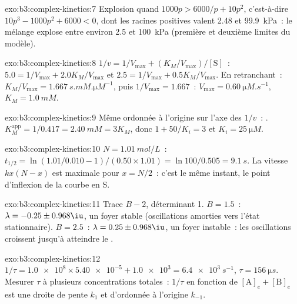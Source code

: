 \begin{solution}{exo:b3:complex-kinetics:7}
Explosion quand $1000p > 6000/p + 10p^2$, c'est-à-dire $10p^3 - 1000p^2 + 6000 < 0$,
dont les racines positives
valent 2.48 et \qty{99.9}{kPa}~: le mélange explose entre environ 2.5 et
\qty{100}{kPa} (première et deuxième limites du modèle).
\end{solution}

\begin{solution}{exo:b3:complex-kinetics:8}
$1/v = 1/V_{\max} + (K_M/V_{\max})/[\mathrm S]$~: $5.0 = 1/V_{\max} + 2.0K_M/V_{\max}$ et $2.5 = 1/V_{\max} + 0.5K_M/V_{\max}$.
En retranchant~: $K_M/V_{\max} = \qty{1.667}{s.mM.\micro M^{-1}}$, puis $1/V_{\max} = 1.667$~: $V_{\max} = \qty{0.60}{\micro M.s^{-1}}$,
$K_M = \qty{1.0}{mM}$.
\end{solution}

\begin{solution}{exo:b3:complex-kinetics:9}
Même ordonnée à l'origine sur l'axe des $1/v$~: .
$K_M^{\mathrm{app}} = 1/0.417 = \qty{2.40}{mM} = 3K_M$, donc
$1 + 50/K_i = 3$ et $K_i = \qty{25}{\micro M}$.
\end{solution}

\begin{solution}{exo:b3:complex-kinetics:10}
$N = \qty{1.01}{mol/L}$~: $t_{1/2} = \ln(1.01/0.010 - 1)/(0.50 \times 1.01) = \ln100/0.505 = \qty{9.1}{s}$.
La vitesse $kx(N - x)$ est maximale pour $x = N/2$~: c'est le même
instant, le point d'inflexion de la courbe en S.
\end{solution}

\begin{solution}{exo:b3:complex-kinetics:11}
Trace $B - 2$, déterminant 1. $B = 1.5$~: $\lambda = -0.25 \pm 0.968\iu$,
un foyer stable (oscillations amorties vers l'état stationnaire).
$B = 2.5$~: $\lambda = 0.25 \pm 0.968\iu$, un foyer instable~: les
oscillations croissent jusqu'à atteindre le .
\end{solution}

\begin{solution}{exo:b3:complex-kinetics:12}
$1/\tau = \num{1.0e8} \times \num{5.40e-5} + \num{1.0e3} = \qty{6.4e3}{s^{-1}}$, $\tau = \qty{156}{\micro s}$.
Mesurer $\tau$ à plusieurs
concentrations totales~: $1/\tau$ en fonction de $[\mathrm A]_e + [\mathrm B]_e$ est une droite de pente $k_1$ et
d'ordonnée à l'origine $k_{-1}$.
\end{solution}

